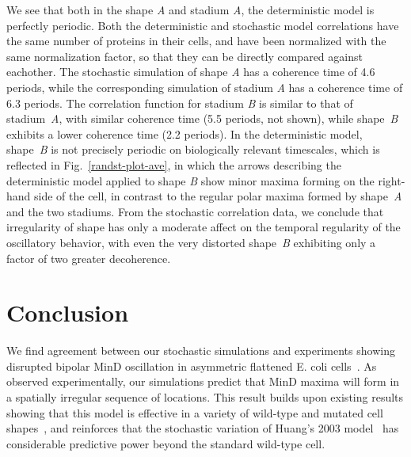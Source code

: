 \documentclass{pnastwo}
\begin{document}
\begin{article}

We see that both in the shape \emph{A} and stadium \emph{A}, the
deterministic model is perfectly periodic.  Both the deterministic and
stochastic model correlations have the same number of proteins in
their cells, and have been normalized with the same normalization
factor, so that they can be directly compared against eachother.  The
stochastic simulation of shape \emph{A} has a coherence time of 4.6
periods, while the corresponding simulation of stadium \emph{A} has a
coherence time of 6.3 periods.
%
The correlation function for stadium \emph{B} is similar to that of
stadium~\emph{A}, with similar coherence time (5.5 periods, not
shown), while shape~\emph{B} exhibits a lower coherence time (2.2
periods).  In the deterministic model, shape~\emph{B} is not precisely
periodic on biologically relevant timescales, which is reflected in
Fig.~\ref{randst-plot-ave}, in which the arrows describing the
deterministic model applied to shape \emph{B} show minor maxima
forming on the right-hand side of the cell, in contrast to the regular
polar maxima formed by shape~\emph{A} and the two stadiums.
%
From the stochastic correlation data, we conclude that irregularity of
shape has only a moderate affect on the temporal regularity of the
oscillatory behavior, with even the very distorted shape~\emph{B}
exhibiting only a factor of two greater decoherence.

\section{Conclusion}

We find agreement between our stochastic simulations and experiments
showing disrupted bipolar MinD oscillation in asymmetric flattened
E. coli cells~\cite{mannik2012robustness}.  As observed
experimentally, our simulations predict that MinD maxima will form in
a spatially irregular sequence of locations.  This result builds upon
existing results showing that this model is effective in a variety of
wild-type and mutated cell shapes~\cite{fange2006noise, varma2008min,
  kruse2007experimentalist}, and reinforces that the stochastic
variation of Huang's 2003 model~\cite{fange2006noise,
  kerr2006division} has considerable predictive power beyond the
standard wild-type cell.



\end{article}
\end{document}
